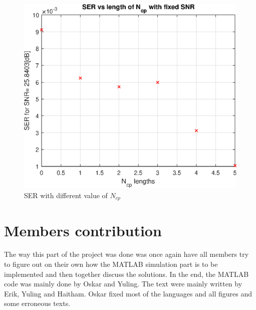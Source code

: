 \documentclass[conference]{IEEEtran}
\begin{document}
\begin{figure}[H]
    \centering
    \includegraphics[width=\linewidth]{images/SER_Ncp.eps}
    \caption{SER with different value of $N_{cp}$}
    \label{SERncp}
\end{figure}


\section{Members contribution}
The way this part of the project was done was once again have all members try to figure out on their own how the MATLAB simulation part is to be implemented and then together discuss the solutions. In the end, the MATLAB code was mainly done by Oskar and Yuling. The text were mainly written by Erik, Yuling and Haitham. Oskar fixed most of the languages and all figures and some erroneous texts. 
\end{document}
